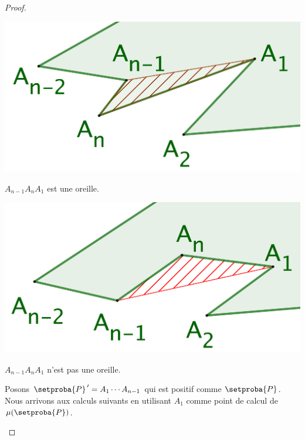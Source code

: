 \begin{proof}
\begin{itemize}
	    \begin{multicols}{2}
    	    \small\itshape
    		\begin{center}
        	\includegraphics[scale=.175]{content/polygon/alg-area/triangulation-proof-OK.png}

	        	\smallskip
    	   		$A_{n-1} A_n A_1$ est une oreille.
    	\end{center}

	    	\begin{center}
        	\includegraphics[scale=.175]{content/polygon/alg-area/triangulation-proof-KO.png}

        		\smallskip
    	   		$A_{n-1} A_n A_1$ n'est pas une oreille.
    		\end{center}
    	\end{multicols}


		\noindent
		Posons $\setproba{P}^{\,\prime} = A_1 \cdots A_{n-1}$ qui est positif comme $\setproba{P}$. 
		Nous arrivons aux calculs suivants en utilisant $A_1$ comme point de calcul de $\mu(\setproba{P})$.


\end{itemize}
\end{proof}

